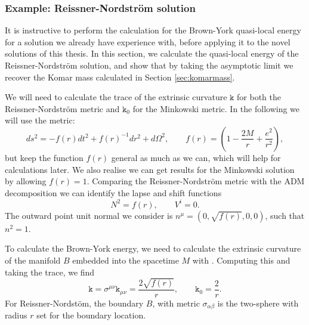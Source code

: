 \subsubsection*{Example: Reissner-Nordstr\"om solution}

It is instructive to perform the calculation for the Brown-York quasi-local energy for a solution we already have experience with, before applying it to the novel solutions of this thesis. In this section, we calculate the quasi-local energy of the Reissner-Nordstr\"om solution, and show that by taking the asymptotic limit we recover the Komar mass calculated in Section \ref{sec:komarmass}.

We will need to calculate the trace of the extrinsic curvature $\mathtt{k}$ for both the Reissner-Nordstr\"om metric and $\mathtt{k}_0$ for the Minkowski metric. In the following we will use the metric:
\begin{equation*}
	ds^2 = -f(r) dt^2 + f(r)^{-1} dr^2 + d\Omega^2, \qquad f(r) = \left(1 - \frac{2M}{r} + \frac{e^2}{r^2} \right),
\end{equation*}
but keep the function $f(r)$ general as much as we can, which will help for calculations later. We also realise we can get results for the Minkowski solution by allowing $f(r) = 1$. Comparing the Reissner-Nordstr\"om metric with the ADM decomposition  we can identify the lapse and shift functions
\begin{equation*}
N^2 = f(r), \qquad V^i = 0.
\end{equation*}
The outward point unit normal we consider is $n^{\mu} = \left(0,\sqrt{f(r)},0,0 \right)$, such that $n^2 = 1$. 

To calculate the Brown-York energy, we need to calculate the extrinsic curvature of the manifold $B$ embedded into the spacetime $M$ with . Computing this and taking the trace, we find
\begin{equation*}
	\mathtt{k} = \sigma^{\mu \nu} \mathtt{k}_{\mu \nu} = \frac{2 \sqrt{f(r)}}{r}, \qquad \mathtt{k}_0 = \frac{2}{r}.
\end{equation*}
For Reissner-Nordst\"om, the boundary $B$, with metric $\sigma_{\alpha \beta}$ is the two-sphere with radius $r$ set for the boundary location.

